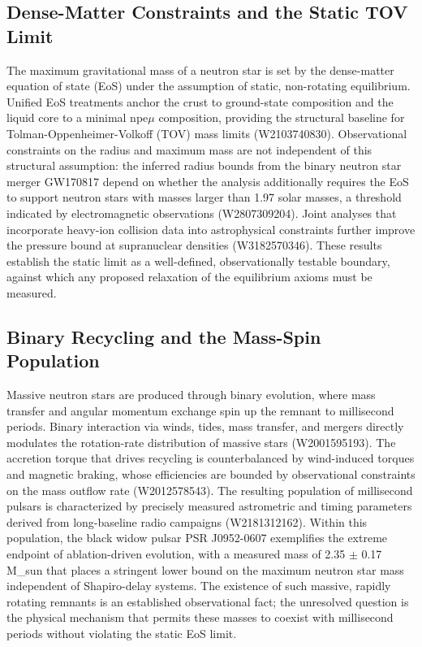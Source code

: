 \documentclass[conference]{IEEEtran}
\begin{document}
\subsection{Dense-Matter Constraints and the Static TOV Limit}
The maximum gravitational mass of a neutron star is set by the dense-matter equation of state (EoS) under the assumption of static, non-rotating equilibrium. Unified EoS treatments anchor the crust to ground-state composition and the liquid core to a minimal npe$\mu$ composition, providing the structural baseline for Tolman-Oppenheimer-Volkoff (TOV) mass limits (W2103740830). Observational constraints on the radius and maximum mass are not independent of this structural assumption: the inferred radius bounds from the binary neutron star merger GW170817 depend on whether the analysis additionally requires the EoS to support neutron stars with masses larger than 1.97 solar masses, a threshold indicated by electromagnetic observations (W2807309204). Joint analyses that incorporate heavy-ion collision data into astrophysical constraints further improve the pressure bound at supranuclear densities (W3182570346). These results establish the static limit as a well-defined, observationally testable boundary, against which any proposed relaxation of the equilibrium axioms must be measured.~\cite{cite_42e341ff6471ce89,cite_55957f4ce67bd972,cite_6c11517977d0b39d}

\subsection{Binary Recycling and the Mass-Spin Population}
Massive neutron stars are produced through binary evolution, where mass transfer and angular momentum exchange spin up the remnant to millisecond periods. Binary interaction via winds, tides, mass transfer, and mergers directly modulates the rotation-rate distribution of massive stars (W2001595193). The accretion torque that drives recycling is counterbalanced by wind-induced torques and magnetic braking, whose efficiencies are bounded by observational constraints on the mass outflow rate (W2012578543). The resulting population of millisecond pulsars is characterized by precisely measured astrometric and timing parameters derived from long-baseline radio campaigns (W2181312162). Within this population, the black widow pulsar PSR J0952-0607 exemplifies the extreme endpoint of ablation-driven evolution, with a measured mass of 2.35 $\pm$ 0.17 M\_sun that places a stringent lower bound on the maximum neutron star mass independent of Shapiro-delay systems. The existence of such massive, rapidly rotating remnants is an established observational fact; the unresolved question is the physical mechanism that permits these masses to coexist with millisecond periods without violating the static EoS limit.~\cite{cite_1e5d552669fc0c56,cite_2908f4a456e2afd6,cite_be7a68ae6d0cde0b,cite_8609757b321d8ce0,cite_fd6df2b02dbddc60}
\end{document}
